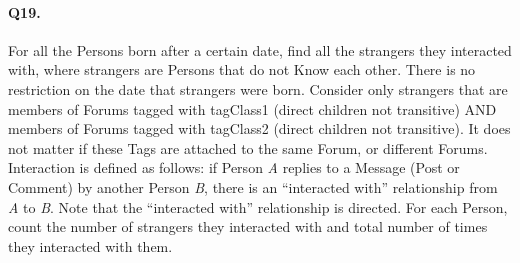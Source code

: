 \paragraph{Q19.}
For all the Persons born after a certain date, find all the strangers
they interacted with, where strangers are Persons that do not Know each
other. There is no restriction on the date that strangers were born.
Consider only strangers that are members of Forums tagged with tagClass1
(direct children not transitive) AND members of Forums tagged with
tagClass2 (direct children not transitive). It does not matter if these
Tags are attached to the same Forum, or different Forums.
Interaction is defined as follows: if Person \emph{A} replies to a
Message (Post or Comment) by another Person \emph{B}, there is an
``interacted with'' relationship from \emph{A} to \emph{B}. Note that
the ``interacted with'' relationship is directed.
For each Person, count the number of strangers they interacted with and
total number of times they interacted with them.
